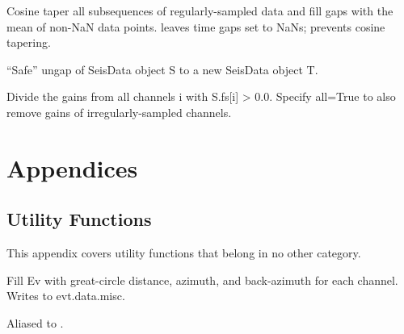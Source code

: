 \documentclass[letterpaper,11pt,english]{sphinxmanual}
\begin{document}
\begin{fulllineitems}
\end{fulllineitems}


Cosine taper all subsequences of regularly-sampled data and fill gaps with the
mean of non-NaN data points.  leaves time gaps set to NaNs;
 prevents cosine tapering.


\begin{fulllineitems}
\end{fulllineitems}


“Safe” ungap of SeisData object S to a new SeisData object T.

Divide the gains from all channels i with S.fs{[}i{]} \textgreater{} 0.0. Specify all=True to
also remove gains of irregularly-sampled channels.


\chapter{Appendices}
\label{\detokenize{index:appendices}}

\section{Utility Functions}
\label{\detokenize{src/Appendices/function_list:utility-functions}}\label{\detokenize{src/Appendices/function_list:function-list}}\label{\detokenize{src/Appendices/function_list::doc}}
This appendix covers utility functions that belong in no other category.


\begin{fulllineitems}
\end{fulllineitems}


Fill Ev with great-circle distance, azimuth, and back-azimuth for each channel. Writes to evt.data.misc.

\begin{fulllineitems}
\label{\detokenize{src/Appendices/function_list:d2u}}
\end{fulllineitems}


Aliased to .
\end{document}
